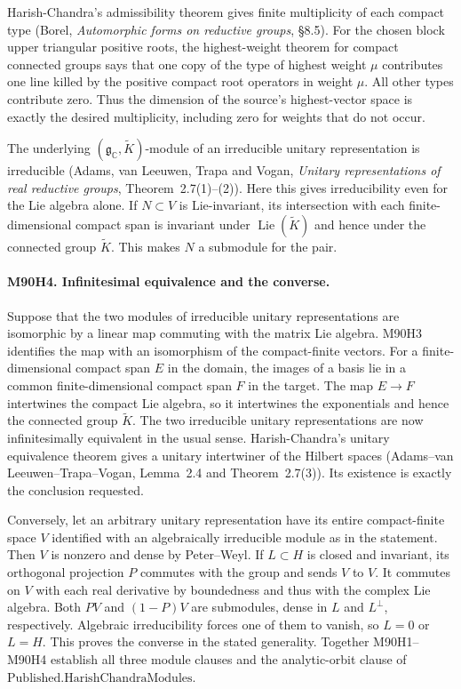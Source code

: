 Harish-Chandra's admissibility theorem gives finite multiplicity of
each compact type (Borel, \emph{Automorphic forms on reductive
groups}, \S8.5). For the chosen block upper triangular positive
roots, the highest-weight theorem for compact connected groups says
that one copy of the type of highest weight $\mu$ contributes one
line killed by the positive compact root operators in weight $\mu$.
All other types contribute zero. Thus the dimension of the source's
highest-vector space is exactly the desired multiplicity, including
zero for weights that do not occur.

The underlying $(\mathfrak g_{\mathbb C},\widetilde K)$-module
of an irreducible unitary representation is irreducible
(Adams, van Leeuwen, Trapa and Vogan, \emph{Unitary representations
of real reductive groups}, Theorem~2.7(1)--(2)).
Here this gives irreducibility even for the Lie algebra alone.
If $N\subset V$ is Lie-invariant, its intersection with each
finite-dimensional compact span is invariant under
$\operatorname{Lie}(\widetilde K)$ and hence under the connected
group $\widetilde K$. This makes $N$ a submodule for the pair.

\paragraph{M90H4. Infinitesimal equivalence and the converse.}
Suppose that the two modules of irreducible unitary representations
are isomorphic by a linear map commuting with the matrix Lie algebra.
M90H3 identifies the map with an isomorphism of the compact-finite
vectors. For a finite-dimensional compact span $E$ in the domain,
the images of a basis lie in a common finite-dimensional compact
span $F$ in the target. The map $E\to F$ intertwines the compact Lie
algebra, so it intertwines the exponentials and hence the connected
group $\widetilde K$. The two irreducible unitary representations
are now infinitesimally equivalent in the usual sense. Harish-Chandra's
unitary equivalence theorem gives a unitary intertwiner of the Hilbert
spaces (Adams--van Leeuwen--Trapa--Vogan, Lemma~2.4 and
Theorem~2.7(3)). Its existence is exactly the conclusion requested.

Conversely, let an arbitrary unitary representation have its entire
compact-finite space $V$ identified with an algebraically irreducible
module as in the statement. Then $V$ is nonzero and dense by
Peter--Weyl. If $L\subset H$ is closed and invariant, its orthogonal
projection $P$ commutes with the group and sends $V$ to $V$.
It commutes on $V$ with each real derivative by boundedness and thus
with the complex Lie algebra. Both $P V$ and $(1-P)V$ are submodules,
dense in $L$ and $L^\perp$, respectively. Algebraic irreducibility
forces one of them to vanish, so $L=0$ or $L=H$. This proves the
converse in the stated generality. Together M90H1--M90H4 establish
all three module clauses and the analytic-orbit clause of
$\mathrm{Published.HarishChandraModules}$.
